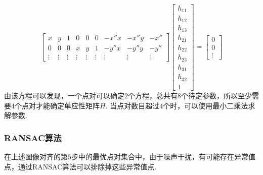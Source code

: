 \documentclass[12pt, a4paper, oneside]{ctexart}
\numberwithin{equation}{section}  %
\theoremstyle{definition}
\begin{document}
\begin{equation*}
    \left[\begin{matrix}
        x&y&1&0&0&0&-x''x&-x''y&-x''\\
        0&0&0&x&y&1&-y''x&-y''y&-y''\\
        \vdots&\vdots&\vdots&\vdots&\vdots&\vdots&\vdots&\vdots&\vdots
    \end{matrix}\right]\left[\begin{matrix}
        h_{11}\\h_{12}\\h_{13}\\h_{21}\\h_{22}\\h_{23}\\h_{31}\\h_{32}\\1
    \end{matrix}\right] = \left[\begin{matrix}
        0\\0\\\vdots
    \end{matrix}\right]
\end{equation*}
由该方程可以发现，一个点对可以确定$2$个方程，总共有$8$个待定参数，所以至少需要$4$个点对才能确定单应性矩阵$H$. 
当点对数目超过$4$个时，可以使用最小二乘法求解参数.

\subsubsection{RANSAC算法}  %
在上述图像对齐的第$5$步中的最优点对集合中，由于噪声干扰，有可能存在异常值点，通过RANSAC算法可以排除掉这些异常值点.
\end{document}
